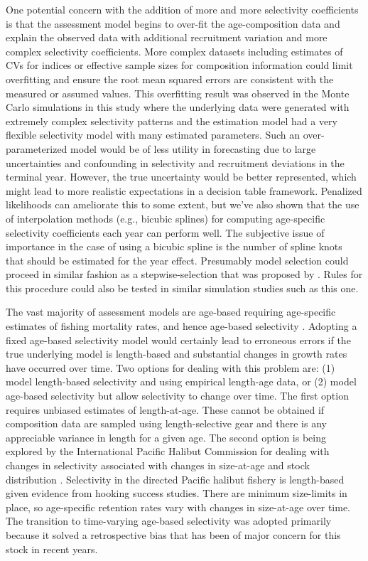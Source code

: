 \documentclass[review,letterpaper,10pt,authoryear]{elsarticle}
\begin{document}
One potential concern with the addition of more and more selectivity coefficients is that the assessment model begins to over-fit the age-composition data and explain the observed data with additional recruitment variation and more complex selectivity coefficients. More complex datasets including estimates of CVs for indices or effective sample sizes for composition information could limit overfitting and ensure the root mean squared errors are consistent with the measured or assumed values.  This overfitting result was observed in the Monte Carlo simulations in this study where the underlying data were generated with extremely complex selectivity patterns and the estimation model had a very flexible selectivity model with many estimated parameters.  Such an over-parameterized model would be of less utility in forecasting due to large uncertainties and confounding in selectivity and recruitment deviations in the terminal year. However, the true uncertainty would be better represented, which might lead to more realistic expectations in a decision table framework.  Penalized likelihoods can ameliorate this to some extent, but we've also shown that the use of interpolation methods (e.g., bicubic splines) for computing age-specific selectivity coefficients each year can perform well.  The subjective issue of importance in the case of using a bicubic spline is the number of spline knots that should be estimated for the year effect.  Presumably model selection could proceed in similar fashion as a stepwise-selection that was proposed by  \cite{thorson2012stepwise}.  Rules for this procedure could also be tested in similar simulation studies such as this one.

 The vast majority of assessment models are age-based requiring age-specific estimates of fishing mortality rates, and hence age-based selectivity \citep{gavaris2002sif}.  Adopting a fixed age-based selectivity model would certainly lead to erroneous errors if the true underlying model is length-based and substantial changes in growth rates have occurred over time.  Two options for dealing with this problem are: (1) model length-based selectivity and using empirical length-age data, or (2) model age-based selectivity but allow selectivity to change over time. The first option requires unbiased estimates of length-at-age.  These cannot be obtained if composition data are sampled using length-selective gear and there is any appreciable variance in length for a given age. The second option is being explored by the International Pacific Halibut Commission for dealing with changes in selectivity associated with changes in size-at-age and stock distribution \citep{stewart2012assessment}.  Selectivity in the directed Pacific halibut fishery is length-based given evidence from hooking success studies. There are minimum size-limits in place, so age-specific retention rates vary with changes in size-at-age over time.  The transition to time-varying age-based selectivity was adopted primarily because it solved a retrospective bias that has been of major concern for this stock in recent years.
\end{document}
